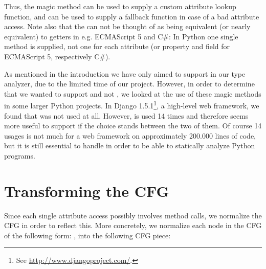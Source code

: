 Thus, the magic method  can be used to supply a custom attribute lookup function, and  can be used to supply a fallback function in case of a bad attribute access. Note also that the  can not be thought of as being equivalent (or nearly equivalent) to getters in e.g. ECMAScript 5 and C\#: In Python one single method is supplied, not one for each attribute (or property and field for ECMAScript 5, respectively C\#).

As mentioned in the introduction we have only aimed to support  in our type analyzer, due to the limited time of our project. However, in order to determine that we wanted to support  and not , we looked at the use of these magic methods in some larger Python projects. In Django 1.5.1\footnote{See \url{http://www.djangoproject.com/}.}, a high-level web framework, we found that  was not used at all. However,  is used 14 times and therefore seems more useful to support if the choice stands between the two of them. Of course 14 usages is not much for a web framework on approximately 200.000 lines of code, but it is still essential to handle in order to be able to statically analyze Python programs.

\section{Transforming the CFG}
Since each single attribute access possibly involves method calls, we normalize the CFG in order to reflect this. More concretely, we normalize each node in the CFG of the following form: , into the following CFG piece:

